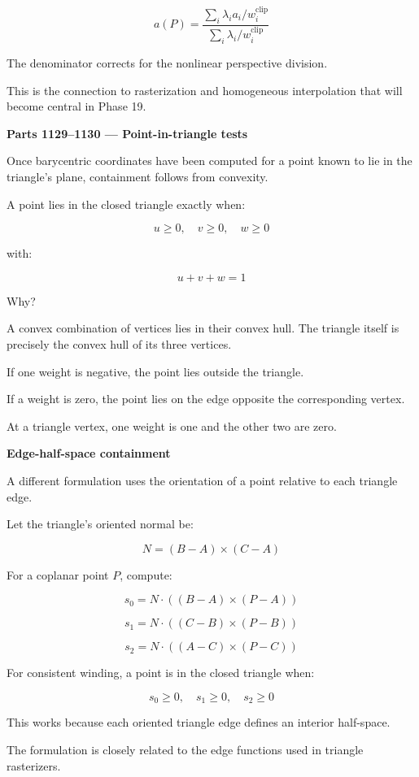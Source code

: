 \[
\boxed{ a(P)= \frac{ \sum_i\lambda_i a_i/w_i^{\mathrm{clip}} }{ \sum_i\lambda_i/w_i^{\mathrm{clip}} } }
\]

The denominator corrects for the nonlinear perspective division.

This is the connection to rasterization and homogeneous interpolation that will become central in Phase 19.

\textbf{Parts 1129--1130 --- Point-in-triangle tests}

Once barycentric coordinates have been computed for a point known to lie in the triangle's plane, containment follows from convexity.

A point lies in the closed triangle exactly when:

\[
\boxed{u\ge0,\quad v\ge0,\quad w\ge0}
\]

with:

\[
u+v+w=1
\]

Why?

A convex combination of vertices lies in their convex hull. The triangle itself is precisely the convex hull of its three vertices.

If one weight is negative, the point lies outside the triangle.

If a weight is zero, the point lies on the edge opposite the corresponding vertex.

At a triangle vertex, one weight is one and the other two are zero.

\textbf{Edge-half-space containment}

A different formulation uses the orientation of a point relative to each triangle edge.

Let the triangle's oriented normal be:

\[
N=(B-A)\times(C-A)
\]

For a coplanar point \(P\), compute:

\[
s_0=N\cdot((B-A)\times(P-A))
\]

\[
s_1=N\cdot((C-B)\times(P-B))
\]

\[
s_2=N\cdot((A-C)\times(P-C))
\]

For consistent winding, a point is in the closed triangle when:

\[
s_0\ge0,\quad s_1\ge0,\quad s_2\ge0
\]

This works because each oriented triangle edge defines an interior half-space.

The formulation is closely related to the edge functions used in triangle rasterizers.

